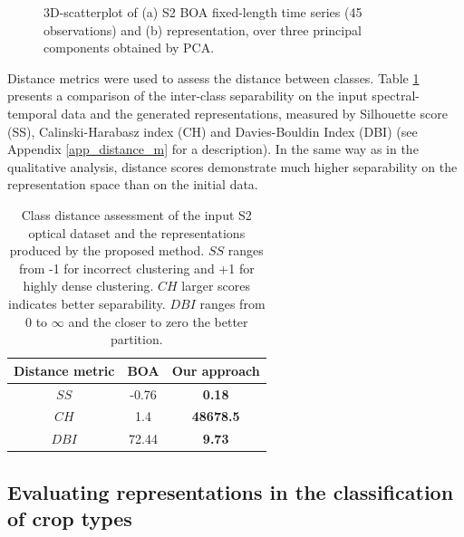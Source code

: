 \documentclass[journal,article,submit,pdftex,moreauthors]{Definitions/mdpi}
\begin{document}
\begin{figure}[H]
\begin{subfigure}[t]{0.5\linewidth}
	\caption{}
	\label{fig:pca_rep}
	\end{subfigure}
	\caption{3D-scatterplot of (a) S2 BOA fixed-length time series (45 observations) and (b) representation, over three principal components obtained by PCA.}
	\label{fcn_losses}
\end{figure}
Distance metrics were used to assess the distance between classes. 
Table \ref{distance_metrics_results} presents a comparison of the inter-class separability on the input spectral-temporal data and the generated representations, measured by Silhouette score (SS), Calinski-Harabasz index (CH) and Davies-Bouldin Index (DBI) (see Appendix \ref{app_distance_m} for a description).
In the same way as in the qualitative analysis, distance scores demonstrate much higher separability on the representation space than on the initial data.
\begin{table}[H]
	\centering
	\caption{Class distance assessment of the input S2 optical dataset and the representations produced by the proposed method. $SS$ ranges from -1 for incorrect clustering and +1 for highly dense clustering. $CH$ larger scores indicates better separability. $DBI$ ranges from 0 to $\infty$ and the closer to zero the better partition.}
	\begin{tabular}{c|c|c}
		\hline
		Distance metric & BOA & Our approach \\
		\hline  	
		$SS$ & -0.76 & \textbf{0.18} \\
		$CH$ & 1.4 & \textbf{48678.5} \\
		$DBI$ & 72.44  & \textbf{9.73} \\
		\hline
	\end{tabular}
	\label{distance_metrics_results}
\end{table}

\subsection{Evaluating representations in the classification of crop types}
\end{document}
